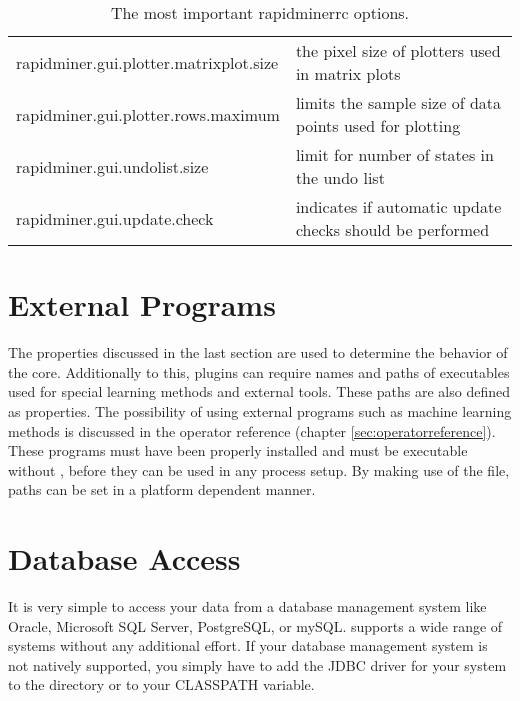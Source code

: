 \begin{table}[htbp]
\begin{tabularx}{\linewidth}{|Z|Y|}
    rapidminer.gui.plotter.matrixplot.size & the pixel size of plotters used in matrix plots \\
    rapidminer.gui.plotter.rows.maximum & limits the sample size of data points used for plotting \\
    rapidminer.gui.undolist.size & limit for number of states in the undo list \\
    rapidminer.gui.update.check & indicates if automatic update checks should be performed \\
    \hline
  \end{tabularx}
  \caption{The most important rapidminerrc options.}
  \label{tab:rapidminerrc_options}
\end{table}



\section{External Programs}

The properties discussed in the last section are used to determine the
behavior of the \rapidminer core. Additionally to this, plugins can require names
and paths of executables used for special learning methods and
external tools. These paths are also defined as properties. The possibility of
using external programs such as machine learning methods is discussed in the
operator reference (chapter \ref{sec:operatorreference}). These programs must
have been properly installed and must be executable without \rapidminer, before they 
can be used in any \rapidminer process setup. By making use of the
 file, paths can be set in a platform dependent
manner.


\section{Database Access}
\label{sec:database_access}

It is very simple to access your data from a database management system like 
Oracle, Microsoft SQL Server, PostgreSQL, or mySQL. \rapidminer supports a wide range
of systems without any additional effort. If your database management system is 
not natively supported, you simply have to add the JDBC driver for your system to 
the directory  or to your CLASSPATH variable.

